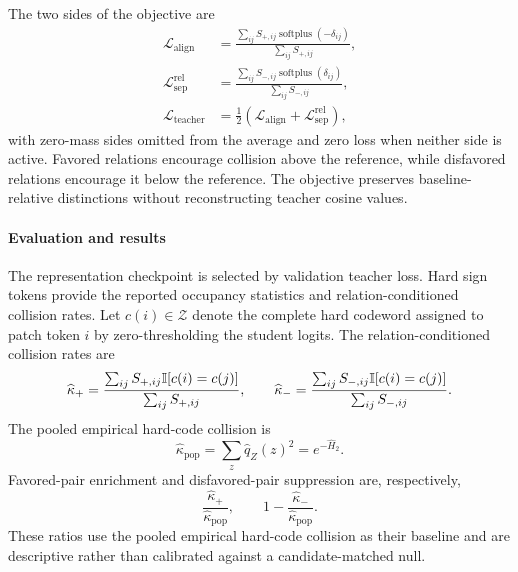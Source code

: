 The two sides of the objective are
\begin{equation}
\begin{aligned}
\mathcal L_{\mathrm{align}}
&=\frac{\sum_{ij}S_{+,ij}\operatorname{softplus}(-\delta_{ij})}{\sum_{ij}S_{+,ij}},\\
\mathcal L_{\mathrm{sep}}^{\mathrm{rel}}
&=\frac{\sum_{ij}S_{-,ij}\operatorname{softplus}(\delta_{ij})}{\sum_{ij}S_{-,ij}},\\
\mathcal L_{\mathrm{teacher}}
&=\tfrac12\left(\mathcal L_{\mathrm{align}}+\mathcal L_{\mathrm{sep}}^{\mathrm{rel}}\right),
\end{aligned}
\label{eq:dino-teacher-loss}
\end{equation}
with zero-mass sides omitted from the average and zero loss when neither side is active.
Favored relations encourage collision above the reference, while disfavored relations encourage it below the reference.
The objective preserves baseline-relative distinctions without reconstructing teacher cosine values.

\paragraph{Evaluation and results}
The representation checkpoint is selected by validation teacher loss.
Hard sign tokens provide the reported occupancy statistics and relation-conditioned collision rates.
Let $c(i)\in\mathcal Z$ denote the complete hard codeword assigned to patch token $i$ by zero-thresholding the student logits.
The relation-conditioned collision rates are
\[
\widehat\kappa_+
=\frac{\sum_{ij}S_{+,ij}\mathbb{I}[c(i)=c(j)]}{\sum_{ij}S_{+,ij}},
\qquad
\widehat\kappa_-
=\frac{\sum_{ij}S_{-,ij}\mathbb{I}[c(i)=c(j)]}{\sum_{ij}S_{-,ij}}.
\]
The pooled empirical hard-code collision is
\[
\widehat\kappa_{\mathrm{pop}}
=\sum_z\widehat q_Z(z)^2
=e^{-\widehat H_2}.
\]
Favored-pair enrichment and disfavored-pair suppression are, respectively,
\[
\frac{\widehat\kappa_+}{\widehat\kappa_{\mathrm{pop}}},
\qquad
1-\frac{\widehat\kappa_-}{\widehat\kappa_{\mathrm{pop}}}.
\]
These ratios use the pooled empirical hard-code collision as their baseline and are descriptive rather than calibrated against a candidate-matched null.

